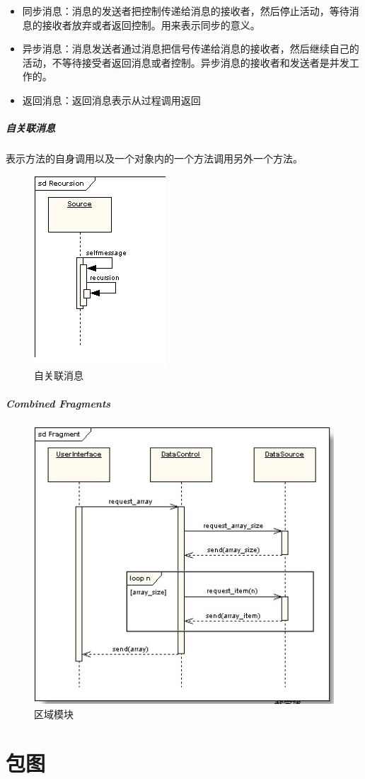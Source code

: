\documentclass[UTF8,a4paper,12pt]{ctexbook}
\begin{document}
			\begin{itemize}
				\item 同步消息：消息的发送者把控制传递给消息的接收者，然后停止活动，等待消息的接收者放弃或者返回控制。用来表示同步的意义。
				\item 异步消息：消息发送者通过消息把信号传递给消息的接收者，然后继续自己的活动，不等待接受者返回消息或者控制。异步消息的接收者和发送者是并发工作的。
				\item 返回消息：返回消息表示从过程调用返回
			\end{itemize}
			
			\subparagraph{自关联消息}
				表示方法的自身调用以及一个对象内的一个方法调用另外一个方法。
				
				\begin{figure}[H]
					\centering
					\includegraphics[scale=1.5]{SelfMessage}
					\caption{自关联消息}
				\end{figure}
				
			\subparagraph{Combined Fragments}
				\begin{figure}[H]
					\centering
					\includegraphics[scale=1]{CombinedFragments}
					\caption{区域模块}
				\end{figure}
				
	\section{包图}
\end{document}
